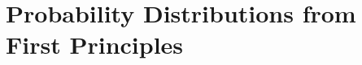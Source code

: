 \chapter{Probability Distributions from First Principles}\label{ch:02}
\providecommand{\twoaBernP}{}\renewcommand{\twoaBernP}{0.9}
\providecommand{\twoaBernMean}{}\renewcommand{\twoaBernMean}{0.9002}
\providecommand{\twoaBernVar}{}\renewcommand{\twoaBernVar}{0.0898}
\providecommand{\twoaBernVarTheory}{}\renewcommand{\twoaBernVarTheory}{0.09}
\providecommand{\twoaTrigExact}{}\renewcommand{\twoaTrigExact}{0.986}
\providecommand{\twoaTrigSim}{}\renewcommand{\twoaTrigSim}{0.9859}
\providecommand{\twoaTrigFour}{}\renewcommand{\twoaTrigFour}{0.8145}
\providecommand{\twoaBinMean}{}\renewcommand{\twoaBinMean}{4.001}
\providecommand{\twoaBinVar}{}\renewcommand{\twoaBinVar}{3.205}
\providecommand{\twoaMultPone}{}\renewcommand{\twoaMultPone}{0.4287}
\providecommand{\twoaMultPtwo}{}\renewcommand{\twoaMultPtwo}{0.26}
\providecommand{\twoaMultVarOneSim}{}\renewcommand{\twoaMultVarOneSim}{12.27}
\providecommand{\twoaMultVarOneTh}{}\renewcommand{\twoaMultVarOneTh}{12.25}
\providecommand{\twoaMultCovSim}{}\renewcommand{\twoaMultCovSim}{-5.577}
\providecommand{\twoaMultCovTh}{}\renewcommand{\twoaMultCovTh}{-5.572}
\providecommand{\twoaMultCorrSim}{}\renewcommand{\twoaMultCorrSim}{-0.5119}
\providecommand{\twoaMultCorrTh}{}\renewcommand{\twoaMultCorrTh}{-0.5134}
\providecommand{\twoaMultCorrPois}{}\renewcommand{\twoaMultCorrPois}{-0.002175}
\providecommand{\twoaMultRowSumVar}{}\renewcommand{\twoaMultRowSumVar}{0}
\providecommand{\twoaPLMean}{}\renewcommand{\twoaPLMean}{3}
\providecommand{\twoaPLVar}{}\renewcommand{\twoaPLVar}{2.986}
\providecommand{\twoaPLZeroSim}{}\renewcommand{\twoaPLZeroSim}{0.04965}
\providecommand{\twoaPLZeroTh}{}\renewcommand{\twoaPLZeroTh}{0.04979}
\providecommand{\twoaTVfive}{}\renewcommand{\twoaTVfive}{0.2191}
\providecommand{\twoaTVtwenty}{}\renewcommand{\twoaTVtwenty}{0.0402}
\providecommand{\twoaTVhundred}{}\renewcommand{\twoaTVhundred}{0.007607}
\providecommand{\twoaTVthousand}{}\renewcommand{\twoaTVthousand}{7.515\times10^{-4}}
\providecommand{\twoaTypExact}{}\renewcommand{\twoaTypExact}{0.423}
\providecommand{\twoaTypPois}{}\renewcommand{\twoaTypPois}{0.4232}
\providecommand{\twoaPPMean}{}\renewcommand{\twoaPPMean}{10.01}
\providecommand{\twoaPPVar}{}\renewcommand{\twoaPPVar}{9.866}
\providecommand{\twoaPPDetMean}{}\renewcommand{\twoaPPDetMean}{3.004}
\providecommand{\twoaPPDetVar}{}\renewcommand{\twoaPPDetVar}{3.008}
\providecommand{\twoaPPSumMean}{}\renewcommand{\twoaPPSumMean}{15}
